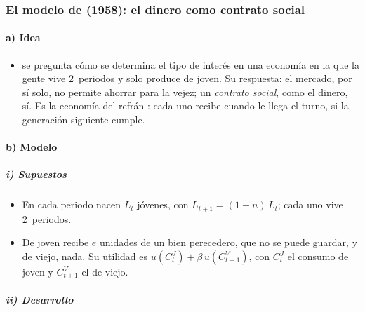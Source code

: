 \documentclass[11pt]{article}
\begin{document}
\subsubsection{El modelo de  (1958): el dinero como contrato social}\label{sec:samuelson}

\paragraph{a) Idea}

\begin{itemize}
\item \textcite{Samuelson1958Exact} se pregunta cómo se determina el tipo de interés en una economía en la que la gente vive 2~periodos y solo produce de joven. Su respuesta: el mercado, por sí solo, no permite ahorrar para la vejez; un \emph{contrato social}, como el dinero, sí. Es la economía del refrán : cada uno recibe cuando le llega el turno, si la generación siguiente cumple.
\end{itemize}

\paragraph{b) Modelo}

\subparagraph{i) Supuestos}

\begin{itemize}
\item En cada periodo nacen $L_t$ jóvenes, con $L_{t+1}=(1+n)\,L_t$; cada uno vive 2~periodos.
\item De joven recibe $e$ unidades de un bien perecedero, que no se puede guardar, y de viejo, nada. Su utilidad es $u(C^J_t)+\beta\,u(C^V_{t+1})$, con $C^J_t$ el consumo de joven y $C^V_{t+1}$ el de viejo.
\end{itemize}

\subparagraph{ii) Desarrollo}
\end{document}
